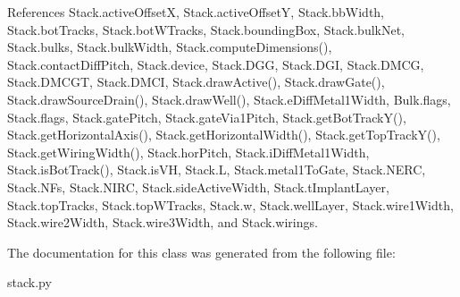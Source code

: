 References Stack.\+active\+OffsetX, Stack.\+active\+OffsetY, Stack.\+bb\+Width, Stack.\+bot\+Tracks, Stack.\+bot\+W\+Tracks, Stack.\+bounding\+Box, Stack.\+bulk\+Net, Stack.\+bulks, Stack.\+bulk\+Width, Stack.\+compute\+Dimensions(), Stack.\+contact\+Diff\+Pitch, Stack.\+device, Stack.\+D\+GG, Stack.\+D\+GI, Stack.\+D\+M\+CG, Stack.\+D\+M\+C\+GT, Stack.\+D\+M\+CI, Stack.\+draw\+Active(), Stack.\+draw\+Gate(), Stack.\+draw\+Source\+Drain(), Stack.\+draw\+Well(), Stack.\+e\+Diff\+Metal1\+Width, Bulk.\+flags, Stack.\+flags, Stack.\+gate\+Pitch, Stack.\+gate\+Via1\+Pitch, Stack.\+get\+Bot\+Track\+Y(), Stack.\+get\+Horizontal\+Axis(), Stack.\+get\+Horizontal\+Width(), Stack.\+get\+Top\+Track\+Y(), Stack.\+get\+Wiring\+Width(), Stack.\+hor\+Pitch, Stack.\+i\+Diff\+Metal1\+Width, Stack.\+is\+Bot\+Track(), Stack.\+is\+VH, Stack.\+L, Stack.\+metal1\+To\+Gate, Stack.\+N\+E\+RC, Stack.\+N\+Fs, Stack.\+N\+I\+RC, Stack.\+side\+Active\+Width, Stack.\+t\+Implant\+Layer, Stack.\+top\+Tracks, Stack.\+top\+W\+Tracks, Stack.\+w, Stack.\+well\+Layer, Stack.\+wire1\+Width, Stack.\+wire2\+Width, Stack.\+wire3\+Width, and Stack.\+wirings.



The documentation for this class was generated from the following file\+:\begin{DoxyCompactItemize}
\item 
stack.\+py\end{DoxyCompactItemize}
